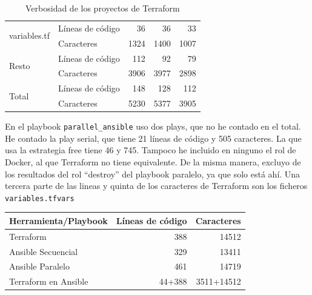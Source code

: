 \documentclass[11pt]{article}
\begin{document}
\begin{flushleft}
\begin{table}[h!]
\begin{tabular}{| l | l | r | r | r |}
        \multirow{2}{*}{variables.tf}       & Líneas de código & 36              & 36                & 33                          \\
                                            & Caracteres       & 1324            & 1400              & 1007                        \\
        \hline
        \multirow{2}{*}{Resto}              & Líneas de código & 112             & 92                & 79                          \\
                                            & Caracteres       & 3906            & 3977              & 2898                        \\
        \hline
        \multirow{2}{*}{Total}              & Líneas de código & 148             & 128               & 112                         \\
                                            & Caracteres       & 5230            & 5377              & 3905                        \\
        \hline

    \end{tabular}
    \caption{Verbosidad de los proyectos de Terraform}
    \label{verbosidad_terraform}
\end{table}

\bigskip

En el playbook \texttt{parallel\_ansible} uso dos plays, que no he contado en el total. He contado la play serial, que tiene 21 líneas de código y 505 caracteres. La que usa la estrategia free tiene 46 y 745. Tampoco he incluido en ninguno el rol de Docker, al que Terraform no tiene equivalente. De la misma manera, excluyo de los resultados del rol ``destroy'' del playbook paralelo, ya que solo está ahí. Una tercera parte de las lineas y quinta de los caracteres de Terraform son los ficheros \texttt{variables.tfvars}
\linebreak

\begin{table}[h!]
    \centering
    \begin{tabular}{| l | r | r |}
        \hline
        \textbf{Herramienta/Playbook}     & \textbf{Líneas de código}  & \textbf{Caracteres} \\
        \hline
        \hline
        
        Terraform                         & 388                        & 14512               \\
        \hline
        Ansible Secuencial                & 329                        & 13411               \\
        \hline
        Ansible Paralelo                  & 461                        & 14719               \\
        \hline
        Terraform en Ansible              & 44+388                    & 3511+14512           \\
        \hline


\end{tabular}
\end{table}
\end{flushleft}
\end{document}
